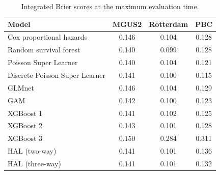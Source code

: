 \begin{table}[htbp]
\centering
\caption{Integrated Brier scores at the maximum evaluation time.}
\label{tab:integrated-brier-scores}
\begin{tabular}{lccc}
\hline
Model & MGUS2 & Rotterdam & PBC \\
\hline
Cox proportional hazards & 0.146 & 0.104 & 0.128 \\
Random survival forest & 0.140 & 0.099 & 0.128 \\
\hline
Poisson Super Learner & 0.140 & 0.104 & 0.121 \\
Discrete Poisson Super Learner & 0.141 & 0.100 & 0.115 \\
\hline
GLMnet & 0.146 & 0.104 & 0.129 \\
GAM & 0.142 & 0.100 & 0.123 \\
XGBoost 1 & 0.141 & 0.102 & 0.125 \\
XGBoost 2 & 0.143 & 0.101 & 0.128 \\
XGBoost 3 & 0.150 & 0.284 & 0.311 \\
HAL (two-way) & 0.141 & 0.101 & 0.136 \\
HAL (three-way) & 0.141 & 0.101 & 0.132 \\
\hline
\end{tabular}
\end{table}

